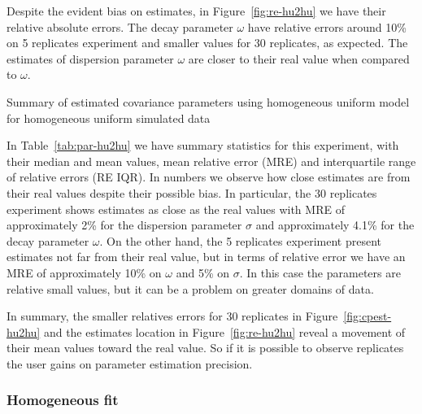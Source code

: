 Despite the evident bias on estimates, in Figure~\ref{fig:re-hu2hu} we have their relative absolute errors. The decay parameter $\omega$ have relative errors around 10\% on 5 replicates experiment and smaller values for 30 replicates, as expected. The estimates of dispersion parameter $\omega$ are closer to their real value when compared to $\omega$.

 

\begin{table}[b]\centering
\caption{Summary of estimated covariance parameters using homogeneous uniform model for homogeneous uniform simulated data}
\begin{knitrout}
\color{fgcolor}\begin{kframe}


{\ttfamily\noindent\bfseries\color{errorcolor}{\#\# Error in eval(lhs, parent, parent): object 'cp' not found}}\end{kframe}
\end{knitrout}
\label{tab:par-hu2hu}
\end{table}


In Table~\ref{tab:par-hu2hu} we have summary statistics for this experiment, with their median and mean values, mean relative error (MRE) and interquartile range of relative errors (RE IQR). In numbers we observe how close estimates are from their real values despite their possible bias. In particular, the 30 replicates experiment shows estimates as close as the real values with MRE of approximately 2\% for the dispersion parameter $\sigma$ and approximately 4.1\% for the decay parameter $\omega$. %
On the other hand, the 5 replicates experiment present estimates not far from their real value, but in terms of relative error we have an MRE of approximately 10\% on $\omega$ and 5\% on $\sigma$. In this case the parameters are relative small values, but it can be a problem on greater domains of data.


In summary, the smaller relatives errors for 30 replicates in Figure~\ref{fig:cpest-hu2hu} and the estimates location in Figure~\ref{fig:re-hu2hu} reveal a movement of their mean values toward the real value. So if it is possible to observe replicates the user gains on parameter estimation precision.


\subsubsection{Homogeneous fit}
\label{sec:mc2homog}


